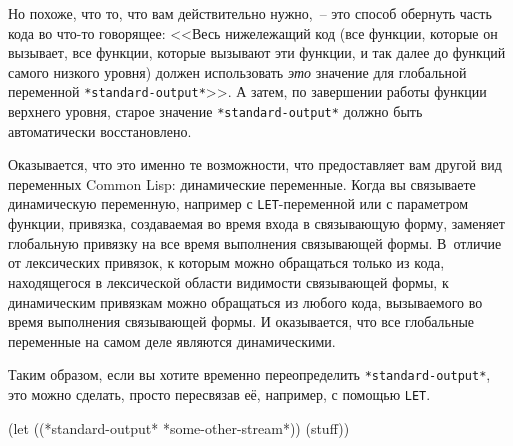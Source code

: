 Но похоже, что то, что вам действительно нужно,~-- это способ обернуть часть кода во что-то
говорящее: <<Весь нижележащий код (все функции, которые он вызывает, все функции, которые
вызывают эти функции, и так далее до функций самого низкого уровня) должен использовать
\textit{это} значение для глобальной переменной \lstinline{*standard-output*}>>. А затем, по завершении
работы функции верхнего уровня, старое значение \lstinline{*standard-output*} должно быть
автоматически восстановлено.

Оказывается, что это именно те возможности, что предоставляет вам другой вид переменных
Common Lisp: динамические переменные. Когда вы связываете динамическую переменную,
например с \lstinline{LET}-переменной или с параметром функции, привязка, создаваемая во
время входа в связывающую форму, заменяет глобальную привязку на все время выполнения
связывающей формы. В~отличие от лексических привязок, к которым можно обращаться только из
кода, находящегося в лексической области видимости связывающей формы, к динамическим
привязкам можно обращаться из любого кода, вызываемого во время выполнения связывающей
формы. И оказывается, что все глобальные переменные на самом деле являются
динамическими.

Таким образом, если вы хотите временно переопределить \lstinline{*standard-output*}, это можно
сделать, просто пересвязав её, например, с помощью \lstinline{LET}.

\begin{myverb}
(let ((*standard-output* *some-other-stream*))
  (stuff))
\end{myverb}


